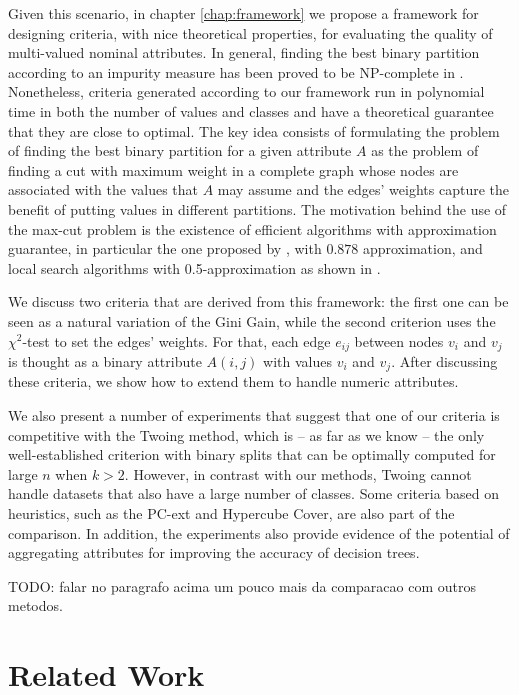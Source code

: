 Given this scenario,  in chapter \ref{chap:framework} we propose
a framework for designing criteria, with nice theoretical properties, for evaluating the quality of 
 multi-valued nominal attributes. In general, finding the best binary partition according to an impurity measure has been proved to be NP-complete in \cite{icml2018}. Nonetheless, criteria generated according to our framework
run in polynomial time in both the number of values and classes and
have a theoretical guarantee that they are close to optimal.
The key idea consists of formulating the problem
of finding the best binary partition for a given attribute $A$ as the  problem of finding a 
cut with maximum weight  in a complete graph whose nodes are associated with the values that $A$ may assume and the edges' weights capture the benefit of putting
values in different partitions. The  motivation behind the use of the max-cut problem is 
the existence of efficient algorithms with 
approximation guarantee, in particular 
the one proposed  by \cite{GoeWil95}, with $0.878$ approximation,
and  local search  algorithms with 0.5-approximation as shown in \cite{journals/corr/AngelBPW16}.


We discuss two criteria that are derived from this framework:
the first one  can be seen as a natural variation of the
Gini Gain, while the second criterion uses the $\chi^2$-test  to set the edges' weights. For that, each
edge $e_{ij}$ between nodes  $v_i$ and $v_j$
is thought as a binary attribute $A(i,j)$ with values $v_i$ and $v_j$.
After discussing these criteria, we show how to extend them to handle
numeric attributes.

We also  present a number of experiments that suggest that one of our criteria is competitive with the Twoing method, which is -- as far as we know -- the only well-established criterion with binary splits that can be optimally computed for large $n$ when $k > 2$. However, in contrast with our methods, Twoing cannot handle datasets that also have a large number of classes. Some criteria based on heuristics, such as the PC-ext and Hypercube Cover, are also part of the comparison. In addition, the experiments also  provide evidence of the potential of aggregating  attributes for improving the accuracy of decision trees.

TODO: falar no paragrafo acima um pouco mais da comparacao com outros metodos.

\section{Related Work}
\label{chap:relatedwork}


